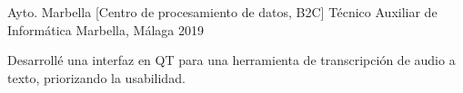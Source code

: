 \begin{cventries}
    \cventry
    {Ayto. Marbella [Centro de procesamiento de datos, B2C]}
    {Técnico Auxiliar de Informática}
    {Marbella, Málaga}
    {2019}
    {
    \begin{cvitems}
        \item{Desarrollé una interfaz en QT para una herramienta de transcripción de audio a texto, priorizando la usabilidad.}
    \end{cvitems}
    }

\end{cventries}

